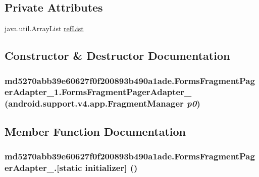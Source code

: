\subsection*{Private Attributes}
\begin{CompactItemize}
\item 
java.util.ArrayList \hyperlink{classmd5270abb39e60627f0f200893b490a1ade_1_1_forms_fragment_pager_adapter__1_aa9e57dd2fbab5e679b3261739ea5a57}{refList}
\end{CompactItemize}


\subsection{Constructor \& Destructor Documentation}
\hypertarget{classmd5270abb39e60627f0f200893b490a1ade_1_1_forms_fragment_pager_adapter__1_7ac0bb4a65db4484306e06831a031fed}{
\subsubsection[{FormsFragmentPagerAdapter\_\-1}]{\setlength{\rightskip}{0pt plus 5cm}md5270abb39e60627f0f200893b490a1ade.FormsFragmentPagerAdapter\_\-1.FormsFragmentPagerAdapter\_ (android.support.v4.app.FragmentManager {\em p0})}}
\label{classmd5270abb39e60627f0f200893b490a1ade_1_1_forms_fragment_pager_adapter__1_7ac0bb4a65db4484306e06831a031fed}




\subsection{Member Function Documentation}
\hypertarget{classmd5270abb39e60627f0f200893b490a1ade_1_1_forms_fragment_pager_adapter__1_8e7d867087c5b110a0eef7ef72dde75a}{
\subsubsection[{[static initializer]}]{\setlength{\rightskip}{0pt plus 5cm}md5270abb39e60627f0f200893b490a1ade.FormsFragmentPagerAdapter\_.\mbox{[}static initializer\mbox{]} ()}}
\label{classmd5270abb39e60627f0f200893b490a1ade_1_1_forms_fragment_pager_adapter__1_8e7d867087c5b110a0eef7ef72dde75a}


